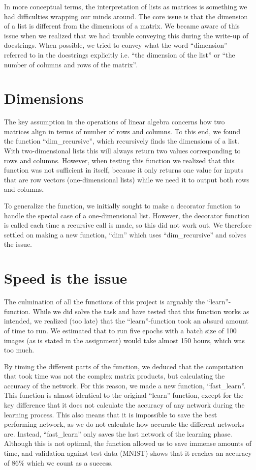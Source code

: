 \documentclass[letterpaper, 12 pt, conference]{ieeeconf}
\begin{document}
In more conceptual terms, the interpretation of lists as matrices is something we had difficulties wrapping our minds around. The core issue is that the dimension of a list is different from the dimensions of a matrix. We became aware of this issue when we realized that we had trouble conveying this during the write-up of docstrings. When possible, we tried to convey what the word “dimension” referred to in the docstrings explicitly i.e. “the dimension of the list” or “the number of columns and rows of the matrix”.

\section{Dimensions}

The key assumption in the operations of linear algebra concerns how two matrices align in terms of number of rows and columns. To this end, we found the function “dim\_recursive”, which recursively finds the dimensions of a list. With two-dimensional lists this will always return two values corresponding to rows and columns. However, when testing this function we realized that this function was not sufficient in itself, because it only returns one value for inputs that are row vectors (one-dimensional lists) while we need it to output both rows and columns.  

To generalize the function, we initially sought to make a decorator function to handle the special case of a one-dimensional list. However, the decorator function is called each time a recursive call is made, so this did not work out. We therefore settled on making a new function, “dim” which uses “dim\_recursive” and solves the issue.

\section{Speed is the issue}

The culmination of all the functions of this project is arguably the “learn”-function. While we did solve the task and have tested that this function works as intended, we realized (too late) that the “learn”-function took an absurd amount of time to run. We estimated that to run five epochs with a batch size of 100 images (as is stated in the assignment) would take almost 150 hours, which was too much. 

By timing the different parts of the function, we deduced that the computation that took time was not the complex matrix products, but calculating the accuracy of the network. For this reason, we made a new function, “fast\_learn”. This function is almost identical to the original “learn”-function, except for the key difference that it does not calculate the accuracy of any network during the learning process. This also means that it is impossible to save the best performing network, as we do not calculate how accurate the different networks are. Instead, “fast\_learn” only saves the last network of the learning phase. Although this is not optimal, the function allowed us to save immense amounts of time, and validation against test data (MNIST) shows that it reaches an accuracy of 86\% which we count as a success. 
\end{document}

